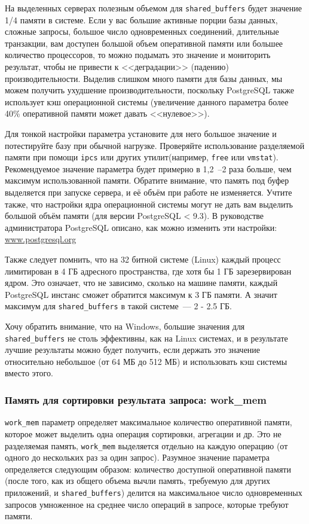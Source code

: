 На выделенных серверах полезным объемом для \lstinline!shared_buffers! будет значение 1/4 памяти в системе. Если у вас большие активные порции базы данных, сложные запросы, большое число одновременных соединений, длительные транзакции, вам доступен большой объем оперативной памяти или большее количество процессоров, то можно подымать это значение и мониторить результат, чтобы не привести к <<деградации>> (падению) производительности. Выделив слишком много памяти для базы данных, мы можем получить ухудшение производительности, поскольку PostgreSQL также использует кэш операционной системы (увеличение данного параметра более 40\% оперативной памяти может давать <<нулевое>>).

Для тонкой настройки параметра установите для него большое значение и потестируйте базу при обычной нагрузке. Проверяйте использование разделяемой памяти при помощи \lstinline!ipcs! или других утилит(например, \lstinline!free! или \lstinline!vmstat!). Рекомендуемое значение параметра будет примерно в 1,2~--2 раза больше, чем максимум использованной памяти. Обратите внимание, что память под буфер выделяется при запуске сервера, и её объём при работе не изменяется. Учтите также, что настройки ядра операционной системы могут не дать вам выделить большой объём памяти (для версии PostgreSQL < 9.3). В руководстве администратора PostgreSQL описано, как можно изменить эти настройки: \href{http://www.postgresql.org/docs/devel/static/kernel-resources.html}{www.postgresql.org}

Также следует помнить, что на 32 битной системе (Linux) каждый процесс лимитирован в 4 ГБ адресного пространства, где хотя бы 1 ГБ зарезервирован ядром. Это означает, что не зависимо, сколько на машине памяти, каждый PostgreSQL инстанс сможет обратится максимум к 3 ГБ памяти. А значит максимум для \lstinline!shared_buffers! в такой системе~--- 2 - 2.5 ГБ.

Хочу обратить внимание, что на Windows, большие значения для \lstinline!shared_buffers! не столь эффективны, как на Linux системах, и в результате лучшие результаты можно будет получить, если держать это значение относительно небольшое (от 64 МБ до 512 МБ) и использовать кэш системы вместо этого.


\subsubsection{Память для сортировки результата запроса: work\_mem}


\lstinline!work_mem! параметр определяет максимальное количество оперативной памяти, которое может выделить одна операция сортировки, агрегации и др. Это не разделяемая память, \lstinline!work_mem! выделяется отдельно на каждую операцию (от одного до нескольких раз за один запрос). Разумное значение параметра определяется следующим образом: количество доступной оперативной памяти (после того, как из общего объема вычли память, требуемую для других приложений, и \lstinline!shared_buffers!) делится на максимальное число одновременных запросов умноженное на среднее число операций в запросе, которые требуют памяти.

